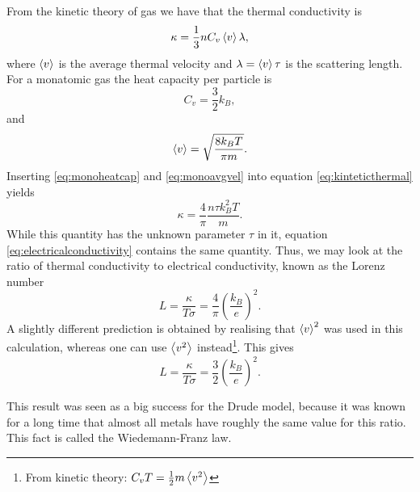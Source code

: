 \documentclass[11pt]{amsart}
\begin{document}
From the kinetic theory of gas we have that the thermal conductivity is
\begin{equation}
\label{eq:kinteticthermal}
\kappa = \frac{1}{3} n C_v \ev{v} \lambda,
\end{equation}
where $\ev{v}$ is the average thermal velocity and  $\lambda = \ev{v} \tau$ is the scattering length. For a monatomic gas the heat capacity per particle is
\begin{equation}
\label{eq:monoheatcap}
C_v = \frac{3}{2}k_B, 
\end{equation}
and 
\begin{equation}
\label{eq:monoavgvel}
\ev{v} = \sqrt{\frac{8k_BT}{\pi m}}.
\end{equation}
Inserting \ref{eq:monoheatcap} and \ref{eq:monoavgvel} into equation \ref{eq:kinteticthermal} yields
\begin{equation}
\kappa = \frac{4}{\pi} \frac{n\tau k_B^2T}{m}.
\end{equation}
While this quantity has the unknown parameter $\tau$ in it, equation \ref{eq:electricalconductivity} contains the same quantity. Thus, we may look at the ratio of thermal conductivity to electrical conductivity,
known as the Lorenz number
\begin{equation}
L = \frac{\kappa}{T\sigma} = \frac{4}{\pi}\left(\frac{k_B}{e} \right)^2.
\end{equation}
A slightly different prediction is obtained by realising that $\ev{v}^2$ was used in this calculation, whereas one can use $\ev{v^2}$ instead\footnote{From kinetic theory: $C_v T = \frac{1}{2}m\ev{v^2}$}. This gives
\begin{equation}
\label{eq:durderesult2}
L = \frac{\kappa}{T\sigma} = \frac{3}{2} \left(\frac{k_B}{e} \right)^2.
\end{equation}

This result was seen as a big success for the Drude model, because it was known for a long time that almost all metals have roughly the same value for this ratio. This fact is called the Wiedemann-Franz law.
\end{document}
